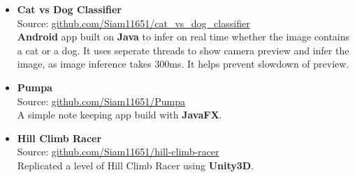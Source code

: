 \begin{itemize}
{  }
  \item {
    \textbf{Cat vs Dog Classifier} \\
    Source: \href{https://github.com/Siam11651/cat_vs_dog_classifier}{github.com/Siam11651/cat\_vs\_dog\_classifier} \\
    \textbf{Android} app built on \textbf{Java} to infer on real time whether the image contains a cat or a dog. It uses seperate threads to show camera preview and infer the image, as image inference takes 300ms. It helps prevent slowdown of preview.
  }
  \item {
    \textbf{Pumpa} \\
    Source: \href{https://github.com/Siam11651/Pumpa}{github.com/Siam11651/Pumpa} \\
    A simple note keeping app build with \textbf{JavaFX}.
  }
  \item {
    \textbf{Hill Climb Racer} \\
    Source: \href{https://github.com/Siam11651/hill-climb-racer}{github.com/Siam11651/hill-climb-racer} \\
    Replicated a level of Hill Climb Racer using \textbf{Unity3D}.
  }
\end{itemize}